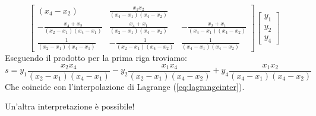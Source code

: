 \begin{example}
\[\begin{bmatrix}
{  (x_4 - x_2)} & \frac{x_1 x_2}{(x_4 - x_1)  (x_4 - x_2)}\\
  - \frac{x_4 + x_2}{(x_2 - x_1)  (x_4 - x_1)} & \frac{x_4 + x_1}{(x_2 - x_1) 
  (x_4 - x_2)} & - \frac{x_2 + x_1}{(x_4 - x_1)  (x_4 - x_2)}\\
  \frac{1}{(x_2 - x_1)  (x_4 - x_1)} & - \frac{1}{(x_2 - x_1)  (x_4 - x_2)} &
  \frac{1}{(x_4 - x_1)  (x_4 - x_2)}
\end{bmatrix}
\begin{bmatrix}
    y_1\\
    y_2\\
    y_4
\end{bmatrix}
\]
Eseguendo il prodotto per la prima riga troviamo:
\[s=y_1\frac{ x_2 x_4}{(x_2 - x_1)  (x_4 - x_1)} - y_2\frac{x_1  x_4}{(x_2 - x_1)
(x_4 - x_2)} + y_4\frac{x_1 x_2 }{(x_4 - x_1)  (x_4 - x_2)} \]
Che coincide con l'interpolazione di Lagrange (\cref{eq:lagrangeinter}).
\end{example}
\begin{remark}
Un'altra interpretazione è possibile!
\end{remark}\pagebreak
